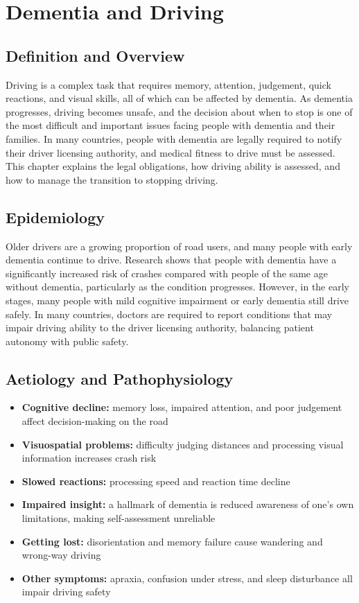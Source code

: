 \chapter{Dementia and Driving}

\section*{Definition and Overview}
Driving is a complex task that requires memory, attention, judgement, quick reactions, and visual skills, all of which can be affected by dementia. As dementia progresses, driving becomes unsafe, and the decision about when to stop is one of the most difficult and important issues facing people with dementia and their families. In many countries, people with dementia are legally required to notify their driver licensing authority, and medical fitness to drive must be assessed. This chapter explains the legal obligations, how driving ability is assessed, and how to manage the transition to stopping driving.

\section*{Epidemiology}
Older drivers are a growing proportion of road users, and many people with early dementia continue to drive. Research shows that people with dementia have a significantly increased risk of crashes compared with people of the same age without dementia, particularly as the condition progresses. However, in the early stages, many people with mild cognitive impairment or early dementia still drive safely. In many countries, doctors are required to report conditions that may impair driving ability to the driver licensing authority, balancing patient autonomy with public safety.

\section*{Aetiology and Pathophysiology}
\begin{itemize}
    \item \textbf{Cognitive decline:} memory loss, impaired attention, and poor judgement affect decision-making on the road
    \item \textbf{Visuospatial problems:} difficulty judging distances and processing visual information increases crash risk
    \item \textbf{Slowed reactions:} processing speed and reaction time decline
    \item \textbf{Impaired insight:} a hallmark of dementia is reduced awareness of one's own limitations, making self-assessment unreliable
    \item \textbf{Getting lost:} disorientation and memory failure cause wandering and wrong-way driving
    \item \textbf{Other symptoms:} apraxia, confusion under stress, and sleep disturbance all impair driving safety
\end{itemize}

